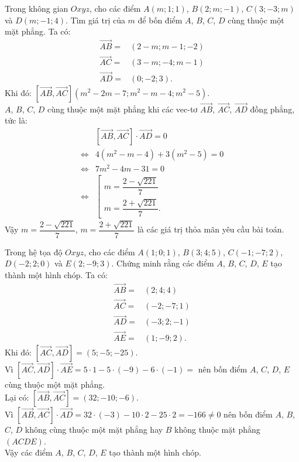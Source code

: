 \begin{bt}%
	Trong không gian $Oxyz$, cho các điểm $A(m;1;1)$, $B(2;m;-1)$, $C(3;-3;m)$ và $D(m;-1;4)$. Tìm giá trị của $m$ để bốn điểm $A$, $B$, $C$, $D$ cùng thuộc một mặt phẳng.
	\loigiai
	{
		Ta có:
		\begin{align*}
		\overrightarrow{AB} = & (2-m;m-1;-2)\\
		\overrightarrow{AC} = & (3-m;-4;m-1)\\
		\overrightarrow{AD} = & (0;-2;3).
		\end{align*}
		Khi đó: $\left[ \overrightarrow{AB}, \overrightarrow{AC} \right] \left( m^2-2m-7; m^2-m-4; m^2-5 \right)$.\\
		$A$, $B$, $C$, $D$ cùng thuộc một mặt phẳng khi các vec-tơ $\overrightarrow{AB}$, $\overrightarrow{AC}$, $\overrightarrow{AD}$ đồng phẳng, tức là:
		\begin{align*}
		& \left[ \overrightarrow{AB}, \overrightarrow{AC} \right] \cdot \overrightarrow{AD} = 0\\
		\Leftrightarrow & 4(m^2-m-4) + 3(m^2-5) = 0 \\
		\Leftrightarrow & 7m^2 - 4m - 31 = 0 \\
		\Leftrightarrow & \left[ \begin{array}{l}
		m = \dfrac{2 - \sqrt{221}}{7} \\ m = \dfrac{2 + \sqrt{221}}{7}.
		\end{array}    \right.
		\end{align*}
		Vậy $m = \dfrac{2 - \sqrt{221}}{7}$, $m = \dfrac{2 + \sqrt{221}}{7}$ là các giá trị thỏa mãn yêu cầu bài toán.
	}
\end{bt}


\begin{bt}%
	Trong hệ tọa độ $Oxyz$, cho các điểm $A (1;0;1)$, $B (3;4;5)$, $C (-1;-7;2)$, $D (-2;2;0)$ và $E (2;-9;3)$. Chứng minh rằng các điểm $A$, $B$, $C$, $D$, $E$ tạo thành một hình chóp.
	\loigiai
	{
		Ta có:
		\begin{align*}
		\overrightarrow{AB} = & (2;4;4)\\
		\overrightarrow{AC} = & (-2;-7;1)\\
		\overrightarrow{AD} = & (-3;2;-1)\\
		\overrightarrow{AE} = & (1;-9;2).
		\end{align*}
		Khi đó: $\left[ \overrightarrow{AC}, \overrightarrow{AD} \right] = (5;-5;-25)$.\\
		Vì $\left[ \overrightarrow{AC}, \overrightarrow{AD} \right] \cdot \overrightarrow{AE} = 5 \cdot 1 - 5 \cdot (-9) - 6 \cdot (-1) = $ nên bốn điểm $A$, $C$, $D$, $E$ cùng thuộc một mặt phẳng.\\
		Lại có: $\left[ \overrightarrow{AB}, \overrightarrow{AC} \right] = (32;-10;-6)$.\\
		Vì $\left[ \overrightarrow{AB}, \overrightarrow{AC} \right] \cdot \overrightarrow{AD} = 32 \cdot (-3) - 10 \cdot 2 - 25 \cdot 2 = -166 \neq 0$ nên bốn điểm $A$, $B$, $C$, $D$ không cùng thuộc một mặt phẳng hay $B$ không thuộc mặt phẳng $(ACDE)$.\\
		Vậy các điểm $A$, $B$, $C$, $D$, $E$ tạo thành một hình chóp.
	}
\end{bt}


